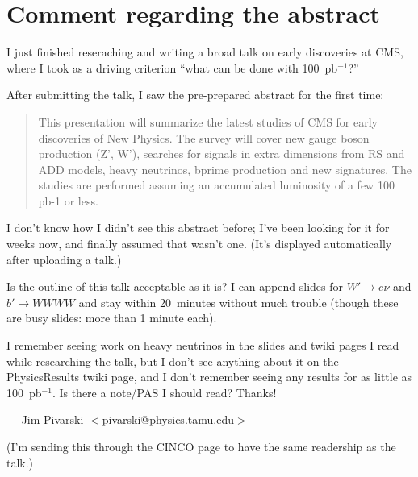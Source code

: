 \documentclass[12pt]{article}
\begin{document}
\section*{Comment regarding the abstract}

I just finished reseraching and writing a broad talk on early
discoveries at CMS, where I took as a driving criterion ``what can be
done with 100~pb$^{-1}$?''

After submitting the talk, I saw the pre-prepared abstract for the
first time:

\begin{quote}
This presentation will summarize the latest studies of CMS for early
discoveries of New Physics. The survey will cover new gauge boson
production (Z', W'), searches for signals in extra dimensions from RS
and ADD models, heavy neutrinos, bprime production and new
signatures. The studies are performed assuming an accumulated
luminosity of a few 100 pb-1 or less.
\end{quote}

I don't know how I didn't see this abstract before; I've been looking
for it for weeks now, and finally assumed that wasn't one.  (It's
displayed automatically after uploading a talk.)

Is the outline of this talk acceptable as it is?  I can append slides
for $W' \to e\nu$ and $b' \to WWWW$ and stay within 20~minutes without
much trouble (though these are busy slides: more than 1 minute each).

I remember seeing work on heavy neutrinos in the slides and twiki
pages I read while researching the talk, but I don't see anything
about it on the PhysicsResults twiki page, and I don't remember seeing
any results for as little as 100~pb$^{-1}$.  Is there a note/PAS I
should read?  Thanks!

\vspace{0.5 cm}
--- Jim Pivarski $<$pivarski@physics.tamu.edu$>$

\vspace{0.5 cm}
(I'm sending this through the CINCO page to have the same readership
as the talk.)
\end{document}
